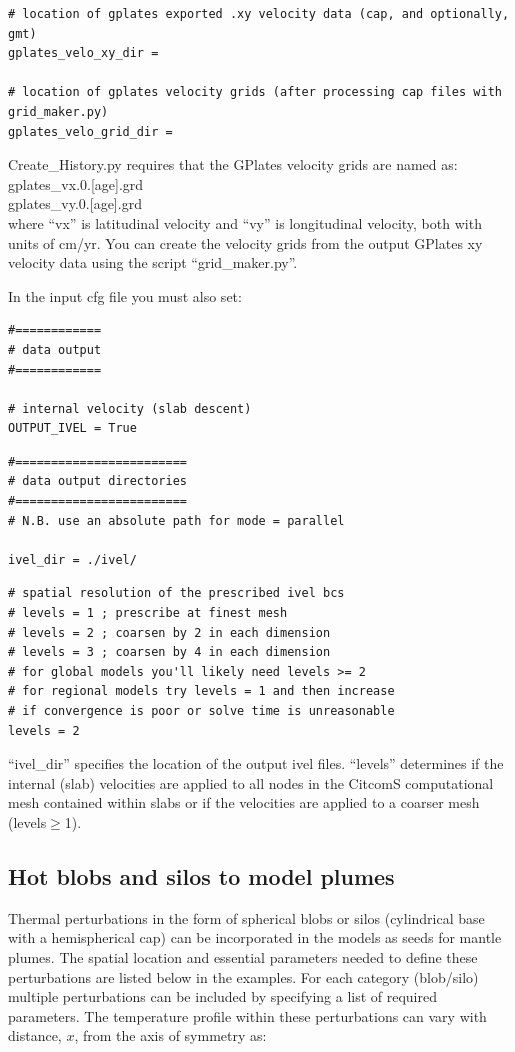 \documentclass[letterpaper,12pt]{article}
\newcommand{\dbnote}[1]{\textcolor{blue}{DJB: #1}}
\begin{document}
\begin{verbatim}
# location of gplates exported .xy velocity data (cap, and optionally, gmt)
gplates_velo_xy_dir =

# location of gplates velocity grids (after processing cap files with grid_maker.py)
gplates_velo_grid_dir =
\end{verbatim}
Create\_History.py requires that the GPlates velocity grids are named as:\\
gplates\_vx.0.[age].grd\\
gplates\_vy.0.[age].grd\\
where ``vx'' is latitudinal velocity and ``vy'' is longitudinal velocity, both with units of cm/yr.  You can create the velocity grids from the output GPlates xy velocity data using the script ``grid\_maker.py''.

In the input cfg file you must also set:
\begin{verbatim}
#============
# data output
#============

# internal velocity (slab descent)
OUTPUT_IVEL = True
\end{verbatim}

\begin{verbatim}
#========================
# data output directories
#========================
# N.B. use an absolute path for mode = parallel

ivel_dir = ./ivel/
\end{verbatim}

\begin{verbatim}
# spatial resolution of the prescribed ivel bcs
# levels = 1 ; prescribe at finest mesh
# levels = 2 ; coarsen by 2 in each dimension
# levels = 3 ; coarsen by 4 in each dimension
# for global models you'll likely need levels >= 2
# for regional models try levels = 1 and then increase
# if convergence is poor or solve time is unreasonable
levels = 2
\end{verbatim}
``ivel\_dir'' specifies the location of the output ivel files.  ``levels'' determines if the internal (slab) velocities are applied to all nodes in the CitcomS computational mesh contained within slabs or if the velocities are applied to a coarser mesh (levels$\ge$1).

\subsection{Hot blobs and silos to model plumes}

Thermal perturbations in the form of spherical blobs or silos (cylindrical base with a hemispherical cap) can be incorporated in the models as seeds for mantle plumes. The spatial location and essential parameters needed to define these perturbations are listed below in the examples. For each category (blob/silo) multiple perturbations can be included by specifying a list of required parameters. The temperature profile within these perturbations can vary with distance, $x$, from the axis of symmetry as:
\end{document}
